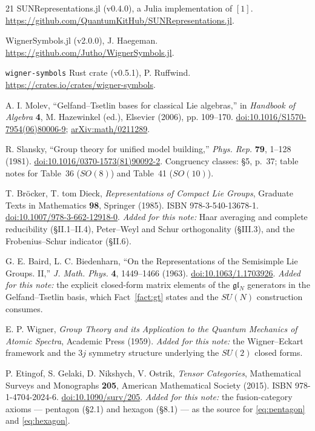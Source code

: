 \documentclass[11pt,a4paper]{article}
\theoremstyle{plain}
\theoremstyle{definition}
\newcommand{\g}{\mathfrak{g}}
\newcommand{\code}[1]{\texttt{#1}}
\begin{document}
\begin{thebibliography}{21}
 SUNRepresentations.jl (v0.4.0), a Julia implementation of
$[1]$. \url{https://github.com/QuantumKitHub/SUNRepresentations.jl}.

 WignerSymbols.jl (v2.0.0), J. Haegeman.
\url{https://github.com/Jutho/WignerSymbols.jl}.

 \code{wigner-symbols} Rust crate (v0.5.1),
P. Ruffwind. \url{https://crates.io/crates/wigner-symbols}.

 A. I. Molev, ``Gelfand--Tsetlin bases for classical Lie
algebras,'' in \emph{Handbook of Algebra} \textbf{4}, M. Hazewinkel (ed.),
Elsevier (2006), pp. 109--170.
\href{https://doi.org/10.1016/S1570-7954(06)80006-9}{doi:10.1016/S1570-7954(06)80006-9};
\href{https://arxiv.org/abs/math/0211289}{arXiv:math/0211289}.

 R. Slansky, ``Group theory for unified model building,''
\emph{Phys. Rep.} \textbf{79}, 1--128 (1981).
\href{https://doi.org/10.1016/0370-1573(81)90092-2}{doi:10.1016/0370-1573(81)90092-2}.
Congruency classes: \S5, p.~37; table notes for Table~36 ($SO(8)$) and
Table~41 ($SO(10)$).

 T. Br\"ocker, T. tom Dieck,
\emph{Representations of Compact Lie Groups},
Graduate Texts in Mathematics \textbf{98}, Springer (1985).
ISBN 978-3-540-13678-1.
\href{https://doi.org/10.1007/978-3-662-12918-0}{doi:10.1007/978-3-662-12918-0}.
\emph{Added for this note:} Haar averaging and complete reducibility
(\S II.1--II.4), Peter--Weyl and Schur orthogonality (\S III.3), and the
Frobenius--Schur indicator (\S II.6).

 G. E. Baird, L. C. Biedenharn,
``On the Representations of the Semisimple Lie Groups. II,''
\emph{J. Math. Phys.} \textbf{4}, 1449--1466 (1963).
\href{https://doi.org/10.1063/1.1703926}{doi:10.1063/1.1703926}.
\emph{Added for this note:} the explicit closed-form matrix elements of the
$\g\mathfrak{l}_N$ generators in the Gelfand--Tsetlin basis, which
Fact~\ref{fact:gt} states and the $SU(N)$ construction consumes.

 E. P. Wigner,
\emph{Group Theory and its Application to the Quantum Mechanics of Atomic
Spectra}, Academic Press (1959).
\emph{Added for this note:} the Wigner--Eckart framework and the $3j$ symmetry
structure underlying the $SU(2)$ closed forms.

 P. Etingof, S. Gelaki, D. Nikshych, V. Ostrik,
\emph{Tensor Categories}, Mathematical Surveys and Monographs \textbf{205},
American Mathematical Society (2015). ISBN 978-1-4704-2024-6.
\href{https://doi.org/10.1090/surv/205}{doi:10.1090/surv/205}.
\emph{Added for this note:} the fusion-category axioms --- pentagon (\S2.1) and
hexagon (\S8.1) --- as the source for
\eqref{eq:pentagon} and \eqref{eq:hexagon}.


\end{thebibliography}
\end{document}
